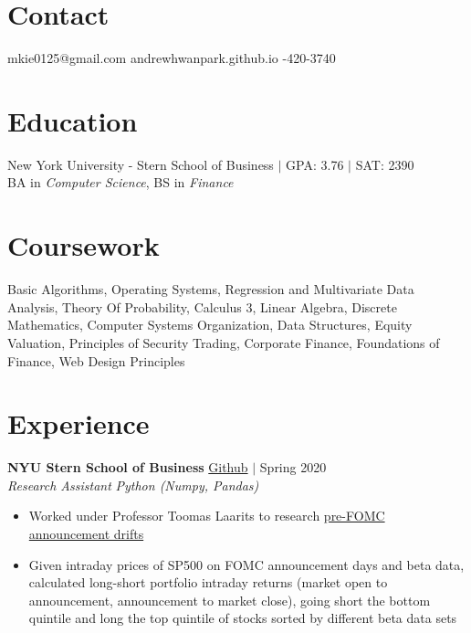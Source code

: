 \documentclass[margin]{res}
\begin{document}
 
 
 
\begin{resume} 
	 
	\section{Contact} 
	mkie0125@gmail.com \quad\quad\quad andrewhwanpark.github.io \quad\quad{}-420-3740
	
	\section{Education} 
	New York University - Stern School of Business $\vert$ GPA: 3.76 $\vert$ SAT: 2390 \\
	BA in {\it Computer Science}, BS in {\it Finance} 
	
	
	\section{Coursework}
	Basic Algorithms, Operating Systems, Regression and Multivariate Data Analysis, Theory Of Probability, Calculus 3, Linear Algebra, Discrete Mathematics, Computer Systems Organization, Data Structures, Equity Valuation, Principles of Security Trading, Corporate Finance, Foundations of Finance, Web Design Principles
	
	\section{Experience}
	{\bf NYU Stern School of Business} \hfill \href{https://github.com/andrewhwanpark/spur}{Github} $\vert$ Spring 2020\\
	{\it Research Assistant} \hfill {\it Python (Numpy, Pandas)}
	\begin{itemize} \itemsep -2pt  %
		\item Worked under Professor Toomas Laarits to research \href{https://www.newyorkfed.org/medialibrary/media/research/staff_reports/sr512.pdf}{pre-FOMC announcement drifts}
		\item Given intraday prices of SP500 on FOMC announcement days and beta data, calculated long-short portfolio intraday returns (market open to announcement, announcement to market close), going short the bottom quintile and long the top quintile of stocks sorted by different beta data sets
	\end{itemize}
	

\end{resume}
\end{document}
